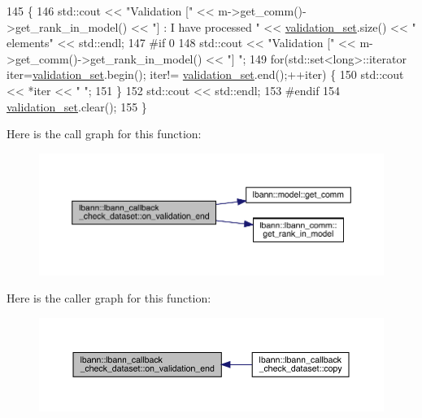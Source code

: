 \begin{DoxyCode}
145                                                              \{
146   std::cout << \textcolor{stringliteral}{"Validation ["} << m->get\_comm()->get\_rank\_in\_model() << \textcolor{stringliteral}{"] : I have processed "} << 
      \hyperlink{classlbann_1_1lbann__callback__check__dataset_aab6d04a40d20d1b0bf70f9bfdd85f84c}{validation\_set}.size() << \textcolor{stringliteral}{" elements"} << std::endl;
147 \textcolor{preprocessor}{#if 0}
148   std::cout << \textcolor{stringliteral}{"Validation ["} << m->get\_comm()->get\_rank\_in\_model() << \textcolor{stringliteral}{"] "};
149   \textcolor{keywordflow}{for}(std::set<long>::iterator iter=\hyperlink{classlbann_1_1lbann__callback__check__dataset_aab6d04a40d20d1b0bf70f9bfdd85f84c}{validation\_set}.begin(); iter!=
      \hyperlink{classlbann_1_1lbann__callback__check__dataset_aab6d04a40d20d1b0bf70f9bfdd85f84c}{validation\_set}.end();++iter) \{
150     std::cout << *iter << \textcolor{stringliteral}{" "};
151   \}
152   std::cout << std::endl;
153 \textcolor{preprocessor}{#endif}
154   \hyperlink{classlbann_1_1lbann__callback__check__dataset_aab6d04a40d20d1b0bf70f9bfdd85f84c}{validation\_set}.clear();
155 \}
\end{DoxyCode}
Here is the call graph for this function\+:\nopagebreak
\begin{figure}[H]
\begin{center}
\leavevmode
\includegraphics[width=350pt]{classlbann_1_1lbann__callback__check__dataset_a9bcb1368152c621c4484136ec8eecff8_cgraph}
\end{center}
\end{figure}
Here is the caller graph for this function\+:\nopagebreak
\begin{figure}[H]
\begin{center}
\leavevmode
\includegraphics[width=350pt]{classlbann_1_1lbann__callback__check__dataset_a9bcb1368152c621c4484136ec8eecff8_icgraph}
\end{center}
\end{figure}
\mbox{\label{classlbann_1_1lbann__callback__check__dataset_a2b9ab1194196d9edc76eb89bc81257b8}} 
